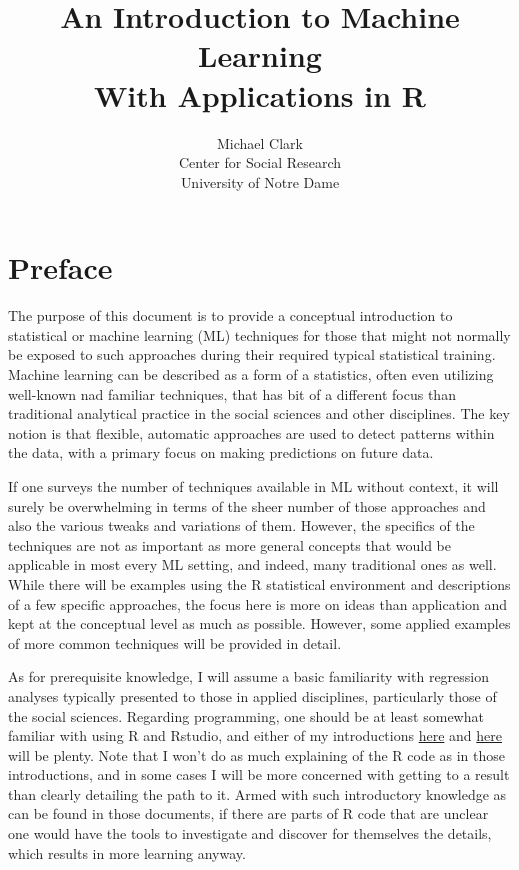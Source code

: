 \documentclass[english,nohyper,titlepage]{tufte-handout}
\title{\LARGE An Introduction to Machine Learning \\ 
\noindent \normalsize With Applications in R\normalsize}
\author{{\small Michael Clark\\
         \noindent Center for Social Research\\
         \noindent University of Notre Dame\\}}
\begin{document}


\maketitle
\pagebreak{}
\tableofcontents{}
\pagebreak{}



\part{Preface}

The purpose of this document is to provide a conceptual introduction to statistical or machine learning (ML) techniques for those that might not normally be exposed to such approaches during their required typical statistical training.  Machine learning can be described as a form of a statistics, often even utilizing well-known nad familiar techniques, that has bit of a different focus than traditional analytical practice in the social sciences and other disciplines.  The key notion is that flexible, automatic approaches are used to detect patterns within the data, with a primary focus on making predictions on future data.

If one surveys the number of techniques available in ML without context, it will surely be overwhelming in terms of the sheer number of those approaches and also the various tweaks and variations of them.  However, the specifics of the techniques are not as important as more general concepts that would be applicable in most every ML setting, and indeed, many traditional ones as well.  While there will be examples using the R statistical environment and descriptions of a few specific approaches, the focus here is more on ideas than application and kept at the conceptual level as much as possible.  However, some applied examples of more common techniques will be provided in detail.

As for prerequisite knowledge, I will assume a basic familiarity with regression analyses typically presented to those in applied disciplines, particularly those of the social sciences.  Regarding programming, one should be at least somewhat familiar with using R and Rstudio, and either of my introductions \href{http://www.nd.edu/~mclark19/learn/Introduction_to_R.pdf}{here} and \href{http://www.nd.edu/~mclark19/learn/Introduction_to_R_II.pdf}{here} will be plenty.  Note that I won't do as much explaining of the R code as in those introductions, and in some cases I will be more concerned with getting to a result than clearly detailing the path to it.  Armed with such introductory knowledge as can be found in those documents, if there are parts of R code that are unclear one would have the tools to investigate and discover for themselves the details, which results in more learning anyway.
\end{document}
